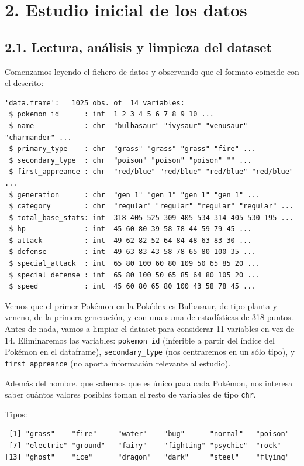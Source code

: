 \documentclass[
  12pt,
]{extreport}
\begin{document}
\chapter{2. Estudio inicial de los
datos}\label{estudio-inicial-de-los-datos}

\section{2.1. Lectura, análisis y limpieza del
dataset}\label{lectura-anuxe1lisis-y-limpieza-del-dataset}

Comenzamos leyendo el fichero de datos y observando que el formato
coincide con el descrito:

\begin{verbatim}
'data.frame':   1025 obs. of  14 variables:
 $ pokemon_id      : int  1 2 3 4 5 6 7 8 9 10 ...
 $ name            : chr  "bulbasaur" "ivysaur" "venusaur" "charmander" ...
 $ primary_type    : chr  "grass" "grass" "grass" "fire" ...
 $ secondary_type  : chr  "poison" "poison" "poison" "" ...
 $ first_appreance : chr  "red/blue" "red/blue" "red/blue" "red/blue" ...
 $ generation      : chr  "gen 1" "gen 1" "gen 1" "gen 1" ...
 $ category        : chr  "regular" "regular" "regular" "regular" ...
 $ total_base_stats: int  318 405 525 309 405 534 314 405 530 195 ...
 $ hp              : int  45 60 80 39 58 78 44 59 79 45 ...
 $ attack          : int  49 62 82 52 64 84 48 63 83 30 ...
 $ defense         : int  49 63 83 43 58 78 65 80 100 35 ...
 $ special_attack  : int  65 80 100 60 80 109 50 65 85 20 ...
 $ special_defense : int  65 80 100 50 65 85 64 80 105 20 ...
 $ speed           : int  45 60 80 65 80 100 43 58 78 45 ...
\end{verbatim}

Vemos que el primer Pokémon en la Pokédex es Bulbasaur, de tipo planta y
veneno, de la primera generación, y con una suma de estadísticas de 318
puntos. Antes de nada, vamos a limpiar el dataset para considerar 11
variables en vez de 14. Eliminaremos las variables: \texttt{pokemon\_id}
(inferible a partir del índice del Pokémon en el dataframe),
\texttt{secondary\_type} (nos centraremos en un sólo tipo), y
\texttt{first\_appreance} (no aporta información relevante al estudio).

Además del nombre, que sabemos que es único para cada Pokémon, nos
interesa saber cuántos valores posibles toman el resto de variables de
tipo \texttt{chr}.

Tipos:

\begin{verbatim}
 [1] "grass"    "fire"     "water"    "bug"      "normal"   "poison"  
 [7] "electric" "ground"   "fairy"    "fighting" "psychic"  "rock"    
[13] "ghost"    "ice"      "dragon"   "dark"     "steel"    "flying"  
\end{verbatim}
\end{document}

